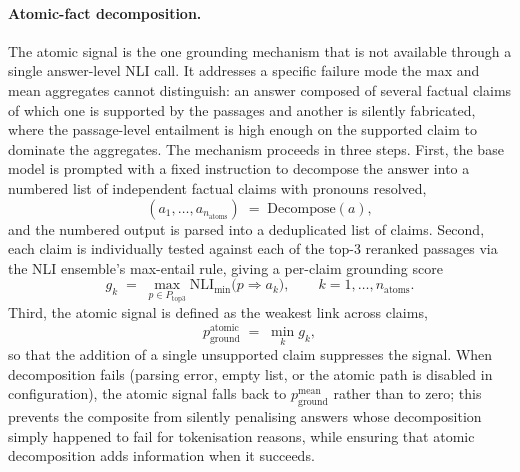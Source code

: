 \paragraph{Atomic-fact decomposition.}
The atomic signal is the one grounding mechanism that is not available through a single answer-level NLI call. It addresses a specific failure mode the max and mean aggregates cannot distinguish: an answer composed of several factual claims of which one is supported by the passages and another is silently fabricated, where the passage-level entailment is high enough on the supported claim to dominate the aggregates. The mechanism proceeds in three steps. First, the base model is prompted with a fixed instruction to decompose the answer into a numbered list of independent factual claims with pronouns resolved,
\begin{equation}
(a_{1},\dots,a_{n_{\text{atoms}}}) \;=\; \mathrm{Decompose}(a),
\label{eq:decompose}
\end{equation}
and the numbered output is parsed into a deduplicated list of claims. Second, each claim is individually tested against each of the top-3 reranked passages via the NLI ensemble's max-entail rule, giving a per-claim grounding score
\begin{equation}
g_{k} \;=\; \max_{p \in P_{\text{top3}}} \mathrm{NLI}_{\min}\bigl(p \Rightarrow a_{k}\bigr), \qquad k = 1, \dots, n_{\text{atoms}}.
\label{eq:atomic-per}
\end{equation}
Third, the atomic signal is defined as the weakest link across claims,
\begin{equation}
p_{\text{ground}}^{\text{atomic}} \;=\; \min_{k} g_{k},
\label{eq:pgatomic}
\end{equation}
so that the addition of a single unsupported claim suppresses the signal. When decomposition fails (parsing error, empty list, or the atomic path is disabled in configuration), the atomic signal falls back to $p_{\text{ground}}^{\text{mean}}$ rather than to zero; this prevents the composite from silently penalising answers whose decomposition simply happened to fail for tokenisation reasons, while ensuring that atomic decomposition adds information when it succeeds.


